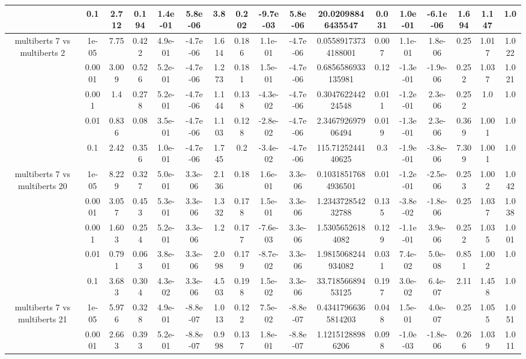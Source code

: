 \begin{tabular}{|c|c|c|c|c|c|c|c|c|c|c|c|c|c|c|c|c|}
 & 0.1 & 2.712 & 0.194 & 1.4e-01 & 5.8e-06 & 3.8 & 0.202 & -9.7e-03 & 5.8e-06 & 20.02098846435547 & 0.031 & 1.0e-01 & -6.1e-06 & 1.694 & 1.147 & 1.0 \\
\hline
\multirow{5}{*}{multiberts 7 vs multiberts 2} & 1e-05 & 7.75 & 0.422 & 4.9e-01 & -4.7e-06 & 1.614 & 0.186 & 1.1e-01 & -4.7e-06 & 0.05589173734188001 & 0.007 & 1.1e-01 & 1.8e-06 & 0.25 & 1.017 & 1.022 \\
 & 0.0001 & 3.009 & 0.526 & 5.2e-01 & -4.7e-06 & 1.273 & 0.181 & 1.5e-01 & -4.7e-06 & 0.6856586933135981 & 0.12 & -1.3e-01 & -1.9e-06 & 0.252 & 1.037 & 1.021 \\
 & 0.001 & 1.4 & 0.278 & 5.2e-01 & -4.7e-06 & 1.144 & 0.138 & -4.3e-02 & -4.7e-06 & 0.304762244224548 & 0.011 & -1.2e-01 & 2.3e-06 & 0.252 & 1.0 & 1.0 \\
 & 0.01 & 0.836 & 0.08 & 3.5e-01 & -4.7e-06 & 1.103 & 0.128 & -2.8e-02 & -4.7e-06 & 2.346792697906494 & 0.019 & -1.3e-01 & 2.3e-06 & 0.369 & 1.001 & 1.0 \\
 & 0.1 & 2.42 & 0.356 & 1.0e-01 & -4.7e-06 & 1.745 & 0.2 & -3.4e-02 & -4.7e-06 & 115.7125244140625 & 0.3 & -1.9e-01 & -3.8e-06 & 7.309 & 1.001 & 1.0 \\
\hline
\multirow{5}{*}{multiberts 7 vs multiberts 20} & 1e-05 & 8.229 & 0.327 & 5.0e-01 & 3.3e-06 & 2.136 & 0.18 & 1.6e-01 & 3.3e-06 & 0.10318517684936501 & 0.01 & -1.2e-01 & -2.5e-06 & 0.253 & 1.002 & 1.042 \\
 & 0.0001 & 3.057 & 0.453 & 5.3e-01 & 3.3e-06 & 1.332 & 0.178 & 1.5e-01 & 3.3e-06 & 1.234372854232788 & 0.135 & -3.8e-02 & -1.8e-06 & 0.25 & 1.037 & 1.038 \\
 & 0.001 & 1.603 & 0.254 & 5.2e-01 & 3.3e-06 & 1.2 & 0.177 & -7.6e-03 & 3.3e-06 & 1.53056526184082 & 0.129 & -1.1e-01 & 3.9e-06 & 0.252 & 1.035 & 1.001 \\
 & 0.01 & 0.791 & 0.063 & 3.8e-01 & 3.3e-06 & 2.098 & 0.179 & -8.7e-02 & 3.3e-06 & 1.9815068244934082 & 0.031 & 7.4e-02 & 5.0e-08 & 0.851 & 1.002 & 1.0 \\
 & 0.1 & 3.683 & 0.304 & 4.3e-02 & 3.3e-06 & 4.503 & 0.198 & 1.5e-02 & 3.3e-06 & 33.71856689453125 & 0.197 & 3.0e-02 & 6.4e-07 & 2.11 & 1.458 & 1.0 \\
\hline
\multirow{5}{*}{multiberts 7 vs multiberts 21} & 1e-05 & 5.976 & 0.328 & 4.9e-01 & -8.8e-07 & 1.013 & 0.122 & 7.5e-02 & -8.8e-07 & 0.43417966365814203 & 0.048 & 1.5e-01 & 4.0e-07 & 0.25 & 1.055 & 1.051 \\
 & 0.0001 & 2.663 & 0.393 & 5.2e-01 & -8.8e-07 & 0.998 & 0.137 & 1.8e-01 & -8.8e-07 & 1.12151288986206 & 0.098 & -1.0e-03 & -1.8e-06 & 0.266 & 1.039 & 1.011 \\

\end{tabular}
